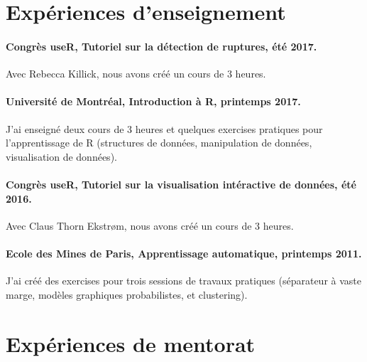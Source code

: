 \documentclass{article}
\begin{document}
\section{Expériences d'enseignement} 


\paragraph{Congrès useR, Tutoriel sur la détection de ruptures, été
  2017.} Avec Rebecca Killick, nous avons créé un cours de 3 heures.

\paragraph{Universit\'e de Montr\'eal, Introduction à R, printemps
  2017.} J'ai enseigné deux cours de 3 heures et quelques exercises
pratiques pour l'apprentissage de R (structures de données, manipulation de données, visualisation de données).

\paragraph{Congrès useR, Tutoriel sur la visualisation intéractive de données, été 2016.} Avec Claus Thorn Ekstr\o m,
nous avons créé un cours de 3 heures.

\paragraph{Ecole des Mines de Paris, Apprentissage automatique,
  printemps 2011.} J'ai créé des exercises pour trois sessions de
travaux pratiques (séparateur à vaste marge, modèles graphiques
probabilistes, et clustering).

\newpage
\section{Expériences de mentorat}
\end{document}

